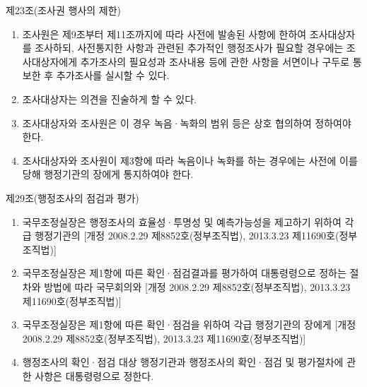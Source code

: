 제23조(조사권 행사의 제한)
\begin{enumerate}[①]\tightlist
\item 조사원은 제9조부터 제11조까지에 따라 사전에 발송된 사항에 한하여 조사대상자를 조사하되, 사전통지한 사항과 관련된 추가적인 행정조사가 필요할 경우에는 조사대상자에게 추가조사의 필요성과 조사내용 등에 관한 사항을 서면이나 구두로 통보한 후 추가조사를 실시할 수 있다.
\item 조사대상자는  의견을 진술하게 할 수 있다.
\item 조사대상자와 조사원은  이 경우 녹음·녹화의 범위 등은 상호 협의하여 정하여야 한다.
\item 조사대상자와 조사원이 제3항에 따라 녹음이나 녹화를 하는 경우에는 사전에 이를 당해 행정기관의 장에게 통지하여야 한다.
\end{enumerate}

제29조(행정조사의 점검과 평가)
\begin{enumerate}[①]\tightlist
\item 국무조정실장은 행정조사의 효율성·투명성 및 예측가능성을 제고하기 위하여 각급 행정기관의  [개정 2008.2.29 제8852호(정부조직법), 2013.3.23 제11690호(정부조직법)]
\item 국무조정실장은 제1항에 따른 확인·점검결과를 평가하여 대통령령으로 정하는 절차와 방법에 따라 국무회의와  [개정 2008.2.29 제8852호(정부조직법), 2013.3.23 제11690호(정부조직법)]
\item 국무조정실장은 제1항에 따른 확인·점검을 위하여 각급 행정기관의 장에게  [개정 2008.2.29 제8852호(정부조직법), 2013.3.23 제11690호(정부조직법)]
\item 행정조사의 확인·점검 대상 행정기관과 행정조사의 확인·점검 및 평가절차에 관한 사항은 대통령령으로 정한다.
\end{enumerate}



